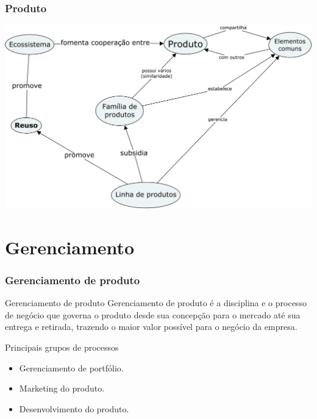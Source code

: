 \begin{frame}
	\frametitle{Produto}
	
	\begin{center}
		\includegraphics[width=\textwidth]{product-family-ecosystem}
	\end{center}
\end{frame}



\section{Gerenciamento}

\begin{frame}
	\frametitle{Gerenciamento de produto}

	\begin{block:concept}{Gerenciamento de produto}
		Gerenciamento de produto é a disciplina e o processo de negócio
		que governa o produto desde sua concepção para o mercado até sua
		entrega e retirada, trazendo o maior valor possível para o
		negócio da empresa.
	\end{block:concept}

	\begin{block:fact}{Principais grupos de processos}
		\begin{itemize}
			\item Gerenciamento de portfólio.
			\item Marketing do produto.
			\item Desenvolvimento do produto.
		\end{itemize}
	\end{block:fact}
	
\end{frame}



